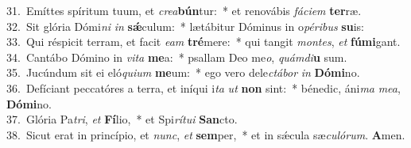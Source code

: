 {31.~}Emíttes spíritum tuum, et \textit{cre}\textit{a}\textbf{bún}tur:~* et renovábis \textit{fá}\textit{ci}\textit{em} \textbf{ter}ræ.\\
{32.~}Sit glória Dómi\textit{ni} \textit{in} \textbf{sǽ}culum:~* lætábitur Dóminus in o\textit{pé}\textit{ri}\textit{bus} \textbf{su}is:\\
{33.~}Qui réspicit terram, et facit \textit{e}\textit{am} \textbf{tré}mere:~* qui tangit \textit{mon}\textit{tes}, \textit{et} \textbf{fú}\textbf{mi}gant.\\
{34.~}Cantábo Dómino in \textit{vi}\textit{ta} \textbf{me}a:~* psallam Deo me\textit{o}, \textit{quám}\textit{di}\textbf{u} sum.\\
{35.~}Jucúndum sit ei eló\textit{qui}\textit{um} \textbf{me}um:~* ego vero dele\textit{ctá}\textit{bor} \textit{in} \textbf{Dó}\textbf{mi}no.\\
{36.~}Defíciant peccatóres a terra, et iníqui i\textit{ta} \textit{ut} \textbf{non} sint:~* bénedic, áni\textit{ma} \textit{me}\textit{a}, \textbf{Dó}\textbf{mi}no.\\
{37.~}Glória Pa\textit{tri}, \textit{et} \textbf{Fí}lio,~* et Spi\textit{rí}\textit{tu}\textit{i} \textbf{San}cto.\\
{38.~}Sicut erat in princípio, et \textit{nunc}, \textit{et} \textbf{sem}per,~* et in sǽcula sæ\textit{cu}\textit{ló}\textit{rum}. \textbf{A}men.\\
